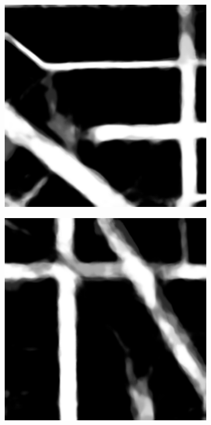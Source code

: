 \documentclass[10pt,conference,compsocconf]{IEEEtran}
\begin{document}
\begin{figure}
    \vspace{0.1cm}
    \begin{subfigure}[b]{0.3\columnwidth}
      \includegraphics[width=\columnwidth]{figures/training_hard/eval_probability_pred_002.png}
    \end{subfigure}
     \begin{subfigure}[b]{0.3\columnwidth}
      \includegraphics[width=\columnwidth]{figures/training_hard/eval_probability_pred_003.png}

\end{subfigure}
\end{figure}
\end{document}
